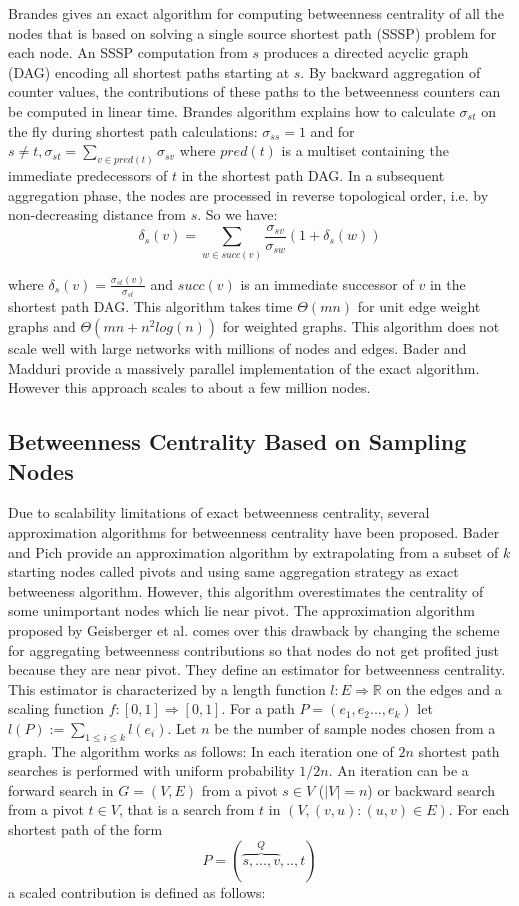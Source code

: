 \documentclass[runningheads,a4paper]{llncs}
\begin{document}
Brandes\cite{brandes} gives an exact algorithm for computing betweenness centrality of all the nodes that is based on solving a single source shortest path (SSSP) problem for each node. An SSSP computation from $s$ produces a directed acyclic graph (DAG) encoding all shortest paths starting at $s$. By backward aggregation of counter values, the contributions of these paths to the betweenness counters can be computed in linear time. Brandes algorithm explains how to calculate $\sigma_{st}$ on the fly during shortest path calculations: $\sigma_{ss} = 1$ and for $s \neq t, \sigma_{st} = \sum_{v \in pred(t)} \sigma_{sv}$ where $pred(t)$ is a multiset containing the immediate predecessors of  $t$ in the shortest path DAG. In a subsequent aggregation phase, the nodes are processed in reverse topological order, i.e. by non-decreasing distance from $s$. So we have: 
$$\delta_{s}(v) = \sum_{w \in succ(v)} \frac{\sigma_{sv}}{\sigma_{sw}}(1+\delta_{s}(w))$$

where $\delta_{s}(v) = \frac{\sigma_{st}(v)}{\sigma_{st}}$ and $succ(v)$ is an immediate successor of $v$  in the shortest path DAG.   
This algorithm takes time $\Theta(mn)$ for unit edge weight graphs and $\Theta(mn + n^{2}log(n))$ for weighted graphs. This algorithm does not scale well with large networks with millions of nodes and edges. Bader and Madduri\cite{bader} provide a massively parallel implementation of the exact algorithm. However this approach scales to about a few million nodes. 

\subsection*{Betweenness Centrality Based on Sampling Nodes}
Due to scalability limitations of exact betweenness centrality, several approximation algorithms for betweenness centrality have been proposed. Bader and Pich\cite{bp} provide an approximation algorithm by extrapolating from a subset of $k$ starting nodes called pivots and using same aggregation strategy as exact betweeness algorithm. However, this algorithm overestimates the centrality of some unimportant nodes which lie near pivot. The approximation algorithm proposed by Geisberger et al. \cite{sanders} comes over this drawback by changing the scheme for aggregating betweenness contributions so that nodes do not get profited just because they are near pivot. They define an estimator for betweenness centrality. This estimator is characterized by a length function $l : E \Rightarrow \mathbb{R}$ on the edges and a scaling function $f : [0,1] \Rightarrow [0,1]$. For a path $P = (e_{1},e_{2}...,e_{k})$ let $l(P) := \sum_{1 \leq i \leq k} l(e_{i})$. Let $n$ be the number of sample nodes chosen from a graph. The algorithm works as follows: In each iteration one of $2n$ shortest path searches is performed with uniform probability $1/2n$. An iteration can be a forward search in $G = (V,E)$ from a pivot $s \in V$ ($|V| = n$) or backward search from a pivot $t \in V$, that is a search from $t$ in $(V,{(v,u) : (u,v) \in E})$. For each shortest path of the form 
$$ P = (\overbrace{s,...,v}^{Q},..,t)$$ 
a scaled contribution is defined as follows:\\
\end{document}
